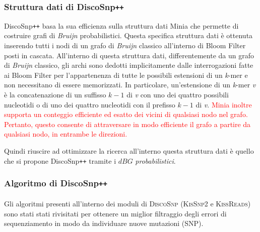 \documentclass[../main.tex]{subfiles}
\begin{document}


\subsubsection{Struttura dati di DiscoSnp\texttt{++}}

DiscoSnp\texttt{++} basa la sua efficienza sulla struttura dati Minia \cite{chikhi2013space} che permette di costruire grafi di \textit{Bruijn} probabilistici. Questa specifica struttura dati è ottenuta inserendo tutti i nodi di un grafo di \textit{Bruijn} classico all'interno di Bloom Filter posti in cascata. All'interno di questa struttura dati, differentemente da un grafo di \textit{Bruijn} classico, gli archi sono dedotti implicitamente dalle interrogazioni fatte ai Bloom Filter per l'appartenenza di tutte le possibili estensioni di un \textit{k}-mer e non necessitano di essere memorizzati. In particolare, un'estensione di un \textit{k}-mer \textit{v} è la concatenazione di un suffisso $\textit{k}-1$ di \textit{v} con uno dei quattro possibili nucleotidi o di uno dei quattro nucleotidi con il prefisso  $\textit{k}-1$ di \textit{v}. \textcolor{red}{Minia inoltre supporta un conteggio efficiente ed esatto dei vicini di qualsiasi nodo nel grafo. Pertanto, questo consente di attraversare in modo efficiente il grafo a partire da qualsiasi nodo, in entrambe le direzioni.}


Quindi riuscire ad ottimizzare la ricerca all'interno questa struttura dati è quello che si propone DiscoSnp\texttt{++} tramite i $dBG$ \textit{probabilistici}.\\

\subsubsection{Algoritmo di DiscoSnp\texttt{++}}

\paragraph{} Gli algoritmi presenti all'interno dei moduli di \textsc{DiscoSnp} (\textsc{KisSnp2} e \textsc{KissReads}) sono stati stati rivisitati per ottenere un miglior filtraggio degli errori di sequenziamento in modo da individuare nuove mutazioni (SNP). 
\end{document}
